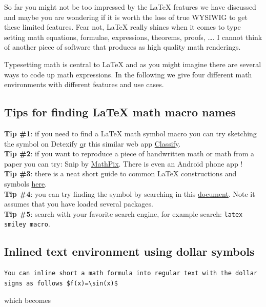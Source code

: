 So far you might not be too impressed by the \LaTeX{} features we have discussed  and maybe you are wondering if it is worth the loss of true WYSIWIG to get these limited features. Fear not, \LaTeX{} really shines when it comes to type setting math equations, formulae, expressions, theorems, proofs, \ldots. I cannot think of another piece of software that produces as high quality math renderings.

Typesetting math is central to \LaTeX{} and as you might imagine there are several ways to code up math expressions. In the following we give four different math environments with different features and use cases.

\subsection{Tips for finding \LaTeX{} math macro names}

\begin{tcolorbox}[colback=white]
{\bf Tip \#1}: if you need to find a \LaTeX{} math symbol macro you can try sketching the symbol on Detexify \href{http://detexify.kirelabs.org/classify.html} or this similar web app \href{http://www.martin-thoma.de/write-math/classify}{Classify}.\\

{\bf Tip \#2}: if you want to reproduce a piece of handwritten math or math from a paper you can try: Snip by \href{https://mathpix.com/}{MathPix}. There is even an Android phone app ! \\

{\bf Tip \#3}: there is a neat short guide to common \LaTeX{} constructions and symbols \href{ftp://ftp.ams.org/pub/tex/doc/amsmath/short-math-guide.pdf}{here}. \\

{\bf Tip \#4}: you can try finding the symbol by searching in this \href{http://milde.users.sourceforge.net/LUCR/Math/unimathsymbols.pdf}{document}. Note it assumes that you have loaded several packages. \\

{\bf Tip \#5}: search with your favorite search engine, for example search: \texttt{latex smiley macro}.
\end{tcolorbox}

\subsection{Inlined text environment using dollar symbols}
\begin{verbatim}
You can inline short a math formula into regular text with the dollar signs as follows $f(x)=\sin(x)$
\end{verbatim}
which becomes

